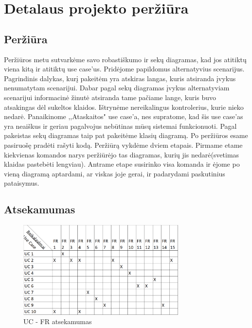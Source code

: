 \documentclass[oneside]{VUMIFPSkursinis}
\begin{document}
\section{Detalaus projekto peržiūra}
	\subsection{Peržiūra}
Peržiūros metu sutvarkėme savo robastiškumo ir sekų diagramas, kad jos atitiktų viena kitą ir atitiktų use case'us. Pridėjome papildomus alternatyvius scenarijus. Pagrindinis dalykas, kurį pakeitėm yra atskiras langas, kuris atsiranda įvykus nenumatytam scenarijui. Dabar pagal sekų diagramas įvykus alternatyviam scenarijui informacinė žinutė atsiranda tame pačiame lange, kuris buvo atsakingas dėl sukeltos klaidos.  Ištrynėme nereikalingus kontrolerius, kurie nieko nedarė. Panaikinome ,,Ataskaitos" use case'a, nes supratome, kad šis use case'as yra neaiškus ir geriau pagalvojus nebūtinas mūsų sistemai funkcionuoti. Pagal pakeistas sekų diagramas taip pat pakeitėme klasių diagramą. Po peržiūros esame pasiruošę pradėti rašyti kodą. Peržiūrą vykdėme dviem etapais. Pirmame etame kiekvienas komandos narys peržiūrėjo tas diagramas, kurių jis nedarė(svetimas klaidas pastebėti lengviau). Antrame etape susirinko visa komanda ir ėjome po vieną  diagramą aptardami, ar viskas joje gerai, ir padarydami paskutinius pataisymus.
	\subsection{Atsekamumas}
	
	\begin{figure}[h]
    				\centering
    				\includegraphics[width=0.75\textwidth]{UCxFR.png}
    				\caption{UC - FR atsekamumas}
			\end{figure}
			
\end{document}
